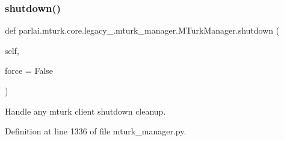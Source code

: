 \subsubsection{\texorpdfstring{shutdown()}{shutdown()}}
{\footnotesize\ttfamily def parlai.\+mturk.\+core.\+legacy\+\_.\+mturk\+\_\+manager.\+M\+Turk\+Manager.\+shutdown (\begin{DoxyParamCaption}\item[{}]{self,  }\item[{}]{force = {\ttfamily False} }\end{DoxyParamCaption})}

\begin{DoxyVerb}Handle any mturk client shutdown cleanup.
\end{DoxyVerb}
 

Definition at line 1336 of file mturk\+\_\+manager.\+py.


